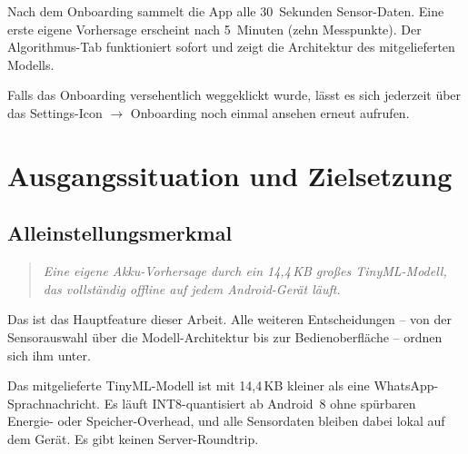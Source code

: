 \documentclass[12pt, a4paper, ngerman]{article}
\begin{document}
\begin{titlepage}
\begin{minipage}{0.62\textwidth}
    Nach dem Onboarding sammelt die App alle 30~Sekunden Sensor-Daten.
    Eine erste eigene Vorhersage erscheint nach 5~Minuten (zehn
    Messpunkte). Der Algorithmus-Tab funktioniert sofort und zeigt
    die Architektur des mitgelieferten Modells.

    Falls das Onboarding versehentlich weggeklickt wurde, lässt
    es sich jederzeit über das Settings-Icon $\to$
    \glqq{}Onboarding noch einmal ansehen\grqq{} erneut aufrufen.
\end{minipage}
\end{titlepage}

\tableofcontents
\newpage
\listoffigures
\newpage
\listoftables
\newpage
{}
\lstlistoflistings
\newpage
{}

\setcounter{section}{-1}

\section{Ausgangssituation und Zielsetzung}
\label{sec:ausgangssituation}

\subsection{Alleinstellungsmerkmal}
\label{sec:usp}

\begin{quote}
\large\itshape Eine eigene Akku-Vorhersage durch ein 14{,}4\,KB
großes TinyML-Modell, das vollständig offline auf jedem
Android-Gerät läuft.
\end{quote}

\noindent Das ist das Hauptfeature dieser Arbeit. Alle weiteren
Entscheidungen -- von der Sensorauswahl über die Modell-Architektur
bis zur Bedienoberfläche -- ordnen sich ihm unter.

Das mitgelieferte TinyML-Modell ist mit 14{,}4\,KB kleiner als eine
WhatsApp-Sprachnachricht. Es läuft INT8-quantisiert ab Android~8
ohne spürbaren Energie- oder Speicher-Overhead, und
alle Sensordaten bleiben dabei lokal auf dem Gerät. Es gibt keinen
Server-Roundtrip.
\end{document}
